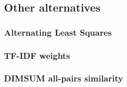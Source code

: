 \subsection{Other alternatives}

\subsubsection{Alternating Least Squares}

\subsubsection{TF-IDF weights}

\subsubsection{DIMSUM all-pairs similarity}